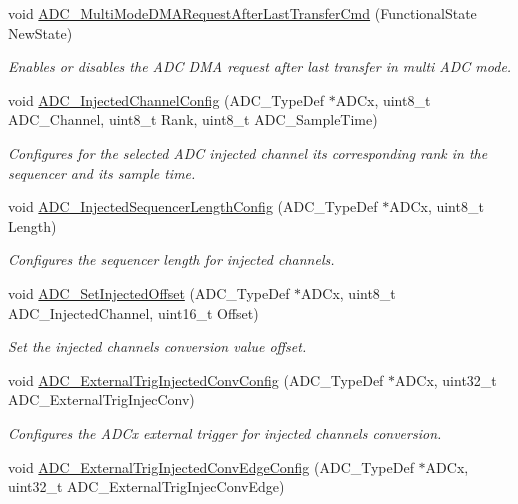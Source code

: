 \begin{DoxyCompactItemize}
void \hyperlink{group___a_d_c_ga40f2be2edf2a33fc15f4a5933b562970}{A\-D\-C\-\_\-\-Multi\-Mode\-D\-M\-A\-Request\-After\-Last\-Transfer\-Cmd} (Functional\-State New\-State)
\begin{DoxyCompactList}\small\item\em Enables or disables the A\-D\-C D\-M\-A request after last transfer in multi A\-D\-C mode. \end{DoxyCompactList}\item 
void \hyperlink{group___a_d_c_gae2b44bff080184e1cf6f2cb6b9bb3e59}{A\-D\-C\-\_\-\-Injected\-Channel\-Config} (A\-D\-C\-\_\-\-Type\-Def $\ast$A\-D\-Cx, uint8\-\_\-t A\-D\-C\-\_\-\-Channel, uint8\-\_\-t Rank, uint8\-\_\-t A\-D\-C\-\_\-\-Sample\-Time)
\begin{DoxyCompactList}\small\item\em Configures for the selected A\-D\-C injected channel its corresponding rank in the sequencer and its sample time. \end{DoxyCompactList}\item 
void \hyperlink{group___a_d_c_ga24eba90bc3ee955e07659a605011710d}{A\-D\-C\-\_\-\-Injected\-Sequencer\-Length\-Config} (A\-D\-C\-\_\-\-Type\-Def $\ast$A\-D\-Cx, uint8\-\_\-t Length)
\begin{DoxyCompactList}\small\item\em Configures the sequencer length for injected channels. \end{DoxyCompactList}\item 
void \hyperlink{group___a_d_c_ga07a942613088ab3ecfc3d97a20475920}{A\-D\-C\-\_\-\-Set\-Injected\-Offset} (A\-D\-C\-\_\-\-Type\-Def $\ast$A\-D\-Cx, uint8\-\_\-t A\-D\-C\-\_\-\-Injected\-Channel, uint16\-\_\-t Offset)
\begin{DoxyCompactList}\small\item\em Set the injected channels conversion value offset. \end{DoxyCompactList}\item 
void \hyperlink{group___a_d_c_gafc02ce1e84e96b692adf085f61a0bca6}{A\-D\-C\-\_\-\-External\-Trig\-Injected\-Conv\-Config} (A\-D\-C\-\_\-\-Type\-Def $\ast$A\-D\-Cx, uint32\-\_\-t A\-D\-C\-\_\-\-External\-Trig\-Injec\-Conv)
\begin{DoxyCompactList}\small\item\em Configures the A\-D\-Cx external trigger for injected channels conversion. \end{DoxyCompactList}\item 
void \hyperlink{group___a_d_c_ga62bea56579f04374fbe830d9e55e6fb0}{A\-D\-C\-\_\-\-External\-Trig\-Injected\-Conv\-Edge\-Config} (A\-D\-C\-\_\-\-Type\-Def $\ast$A\-D\-Cx, uint32\-\_\-t A\-D\-C\-\_\-\-External\-Trig\-Injec\-Conv\-Edge)

\end{DoxyCompactItemize}
